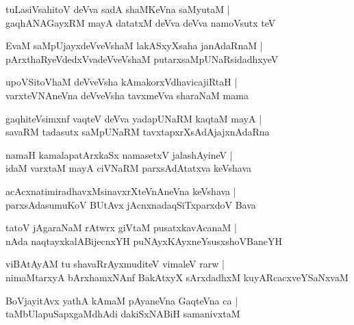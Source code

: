 \documentclass[twoside,12pt,openright]{book}
\newcounter{shloka}[chapter]
\begin{document}
\begin{shloka}%
tuLasiVsahitoV deVva sadA shaMKeVna saMyutaM |\\
gaqhANAGayxRM mayA datatxM deVva deVva namoVsutx teV
\end{shloka}

\begin{shloka}%
EvaM saMpUjayxdeVveVshaM lakASxyXsaha janAdaRnaM |\\
pArxthaRyeVdedxVvadeVveVshaM putarxsaMpUNaRsidadhxyeV 
\end{shloka}

\begin{shloka}%
upoVSitoVhaM deVveVsha kAmakorxVdhavicajiRtaH |\\
varxteVNAneVna deVveVsha tavxmeVva sharaNaM mama
\end{shloka}


\begin{shloka}%
gaqhiteVsimxnf vaqteV deVva yadapUNaRM kaqtaM mayA |\\
savaRM tadasutx saMpUNaRM tavxtapxrXsAdAjajxnAdaRna
\end{shloka}

\begin{shloka}%
namaH kamalapatArxkaSx namasetxV jalashAyineV |\\
idaM varxtaM mayA ciVNaRM parxsAdAtatxva keVshava
\end{shloka}

\begin{shloka}%
acAcxnatimiradhavxMsinavxrXteVnAneVna keVshava |\\
parxsAdasumuKoV BUtAvx jAcnxnadaqSiTxparxdoV Bava
\end{shloka}

\begin{shloka}%
tatoV jAgaraNaM rAtwrx giVtaM pusatxkavAcanaM |\\
nAda naqtayxkalABijecnxYH puNAyxKAyxneYsusxshoVBaneYH
\end{shloka}

\begin{shloka}%
viBAtAyAM tu shavaRrAyxmuditeV vimaleV rarw |\\
nimaMtarxyA bArxhamxNAnf BakAtxyX sArxdadhxM kuyARcacxveYSaNxvaM 
\end{shloka}

\begin{shloka}%
BoVjayitAvx yathA kAmaM pAyaneVna GaqteVna ca |\\
taMbUlapuSapxgaMdhAdi dakiSxNABiH samanivxtaM 
\end{shloka}
\end{document}
